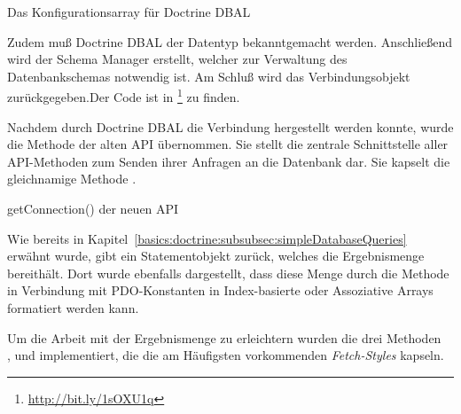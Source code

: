 \begin{listing}[H]
\caption{Das Konfigurationsarray für Doctrine DBAL}
\label{lst:DoctrineConfigArray}
\end{listing}

Zudem muß Doctrine DBAL der Datentyp  bekanntgemacht werden. Anschließend wird der Schema Manager erstellt, welcher zur Verwaltung des Datenbankschemas notwendig ist. Am Schluß wird das Verbindungsobjekt zurückgegeben.Der Code ist in \footnote{\url{http://bit.ly/1sOXU1q}} zu finden.

Nachdem durch Doctrine DBAL die Verbindung hergestellt werden konnte, wurde die Methode  der alten API übernommen. Sie stellt die zentrale Schnittstelle aller API-Methoden zum Senden ihrer Anfragen an die Datenbank dar. Sie kapselt die gleichnamige Methode .

\begin{listing}
\caption{getConnection() der neuen API}
\label{lst:getConnectionNewAPI}
\end{listing}

Wie bereits in Kapitel~\ref{basics:doctrine:subsubsec:simpleDatabaseQueries} erwähnt wurde, gibt  ein Statementobjekt zurück, welches die Ergebnismenge bereithält. Dort wurde ebenfalls dargestellt, dass diese Menge durch die Methode  in Verbindung mit PDO-Konstanten in Index-basierte oder Assoziative Arrays formatiert werden kann.

Um die Arbeit mit der Ergebnismenge zu erleichtern wurden die drei Methoden\\ ,  und  implementiert, die die am Häufigsten vorkommenden  \textit{Fetch-Styles} kapseln.

